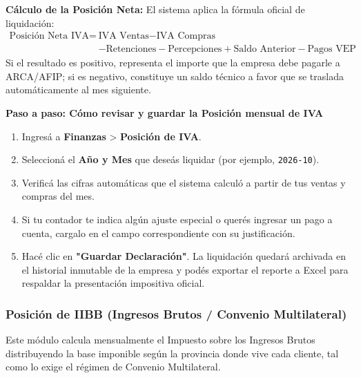\documentclass[12pt,a4paper]{article}
\renewcommand{\_}{\textunderscore\allowbreak}
\begin{document}
\textbf{Cálculo de la Posición Neta:}
El sistema aplica la fórmula oficial de liquidación:
\begin{equation}
    \begin{aligned}
        \text{Posición Neta IVA} ={} & \text{IVA Ventas} - \text{IVA Compras} \\
        & - \text{Retenciones} - \text{Percepciones} + \text{Saldo Anterior} - \text{Pagos VEP}
    \end{aligned}
\end{equation}
Si el resultado es positivo, representa el importe que la empresa debe pagarle a ARCA/AFIP; si es negativo, constituye un saldo técnico a favor que se traslada automáticamente al mes siguiente.

\textbf{Paso a paso: Cómo revisar y guardar la Posición mensual de IVA}
\begin{enumerate}
    \item Ingresá a \textbf{Finanzas} > \textbf{Posición de IVA}.
    \item Seleccioná el \textbf{Año y Mes} que deseás liquidar (por ejemplo, \texttt{2026-10}).
    \item Verificá las cifras automáticas que el sistema calculó a partir de tus ventas y compras del mes.
    \item Si tu contador te indica algún ajuste especial o querés ingresar un pago a cuenta, cargalo en el campo correspondiente con su justificación.
    \item Hacé clic en \textbf{"Guardar Declaración"}. La liquidación quedará archivada en el historial inmutable de la empresa y podés exportar el reporte a Excel para respaldar la presentación impositiva oficial.
\end{enumerate}

\subsubsection{Posición de IIBB (Ingresos Brutos / Convenio Multilateral)}
Este módulo calcula mensualmente el Impuesto sobre los Ingresos Brutos distribuyendo la base imponible según la provincia donde vive cada cliente, tal como lo exige el régimen de Convenio Multilateral.
\end{document}
